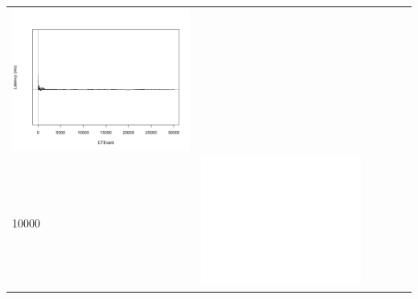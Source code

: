 \begin{table}[htbp]
{\begin{tabular}{l | ccccc}
\begin{minipage}{.15\textwidth}
     			 	\includegraphics[width=\linewidth]{images/lat-log-triple/I13}
    				 \end{minipage}\\
		10000  &	 \begin{minipage}{.15\textwidth}\vspace{2pt}     							
     			 	\includegraphics[width=\linewidth]{images/lat-log-triple/I5}
    				 \end{minipage}
    			   &	 \begin{minipage}{.15\textwidth}\vspace{2pt}     							

\end{minipage}
\end{tabular}}
\end{table}
